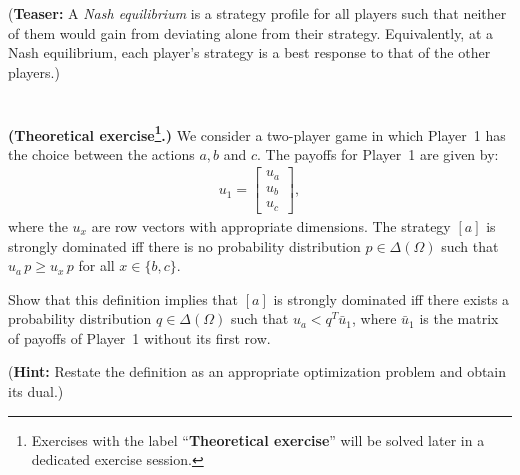 \documentclass{../ape}
\begin{document}
(\textbf{Teaser:} A \emph{Nash equilibrium} is a strategy profile for all players such that neither of them would gain from deviating alone from their strategy. Equivalently, at a Nash equilibrium, each player's strategy is a best response to that of the other players.)


\section{}
\textbf{(Theoretical exercise\footnote{\footnotesize Exercises with the label ``\textbf{Theoretical exercise}'' will be solved later in a dedicated exercise session.}.)} We consider a two-player game in which Player~1 has the choice between the actions $a, b$ and $c$. The payoffs for Player~1 are given by:
\begin{align*}
	u_1 = \begin{bmatrix} u_a \\ u_b \\ u_c \end{bmatrix},
\end{align*} 
where the $u_x$ are row vectors with appropriate dimensions. The strategy $[a]$ is strongly dominated iff there is no probability distribution $p \in \Delta(\Omega)$ such that $u_a \, p \geq u_x \, p$ for all $x \in \{ b, c \}$.

Show that this definition implies that $[a]$ is strongly dominated iff there exists a probability distribution $q \in \Delta(\Omega)$ such that $u_a < q^T \bar{u}_1$, where $\bar{u}_1$ is the matrix of payoffs of Player~1 without its first row.

(\textbf{Hint:} Restate the definition as an appropriate optimization problem and obtain its dual.)
\end{document}
